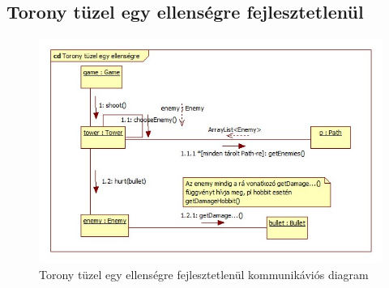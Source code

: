 \subsection{Torony tüzel egy ellenségre fejlesztetlenül}
\begin{figure}[H]
\begin{center}
\includegraphics[width=17cm]{chapters/chapter05/images/cd_Torony_tuzel_egy_ellensegre_fejlesztetlenul.jpg}
\caption{Torony tüzel egy ellenségre fejlesztetlenül kommunikáviós diagram}
\label{fig:cd_Torony_tuzel_egy_ellensegre_fejlesztetlenul}
\end{center}
\end{figure}








